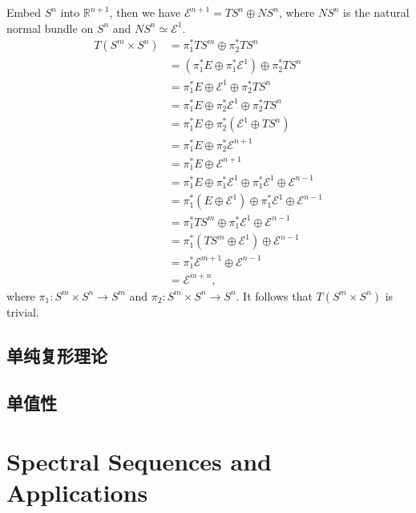 \begin{itemize}
        \qquad Embed $S^n$ into $\mathbb{R}^{n+1}$, then we have 
        $\mathcal{E}^{n+1}=TS^n \oplus NS^n$, 
        where $NS^n$ is the natural normal bundle 
        on $S^n$ and $NS^n\simeq \mathcal{E}^1$.
            \begin{align*}
                T(S^m\times S^n) &= \pi_1^*TS^m \oplus \pi_2^* TS^n\\
                &=(\pi_1^*E\oplus \pi_1^*\mathcal{E}^1) \oplus \pi_2^*TS^n\\
                &=\pi_1^*E \oplus \mathcal{E}^1 \oplus \pi_2^*TS^n\\
                &=\pi_1^* E \oplus \pi_2^*\mathcal{E}^1 \oplus \pi_2^* TS^n\\
                &=\pi_1^*E \oplus \pi_2^*(\mathcal{E}^1\oplus TS^n)\\
                &=\pi_1^*E \oplus \pi_2^*\mathcal{E}^{n+1}\\
                &=\pi_1^*E \oplus \mathcal{E}^{n+1}\\
                &=\pi_1^*E\oplus \pi_1^*\mathcal{E}^1 \oplus \pi_1^*\mathcal{E}^1 \oplus \mathcal{E}^{n-1}\\
                &=\pi_1^*(E\oplus \mathcal{E}^1)\oplus \pi_1^*\mathcal{E}^1 \oplus \mathcal{E}^{n-1}\\
                &=\pi_1^*TS^m \oplus \pi_1^* \mathcal{E}^1 \oplus \mathcal{E}^{n-1}\\
                &=\pi_1^*(TS^m \oplus \mathcal{E}^1)\oplus \mathcal{E}^{n-1}\\
                &=\pi_1^*\mathcal{E}^{m+1} \oplus \mathcal{E}^{n-1}\\
                &=\mathcal{E}^{m+n},
            \end{align*}
        where $\pi_1:S^m\times S^n\rightarrow S^m$ and $\pi_2: S^m\times S^n\rightarrow S^n$. It follows that $T(S^m\times S^n)$ is trivial.
\end{itemize}

\subsection{单纯复形理论}

\subsection{单值性}

\section{Spectral Sequences and Applications}
